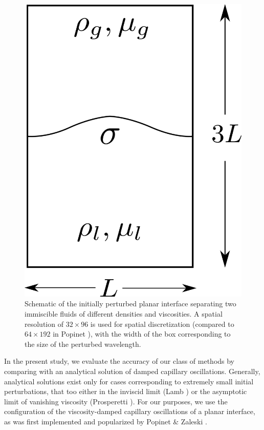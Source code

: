 \begin{figure}[h!]
    \centering
    \includegraphics[width = 1.0\textwidth]{plots/capwave/capwave_conf.png}
	\caption{Schematic of the initially perturbed planar interface separating two immiscible fluids of different densities and viscosities. A spatial resolution of $32 \times 96$ is used for spatial discretization (compared to $64 \times 192$ in Popinet \cite{popinet2009accurate}), with the width of the box corresponding to the size of the perturbed wavelength.}
    \label{capwave_conf}
\end{figure}

In the present study, we evaluate the accuracy of our class of methods by comparing with an analytical solution of damped capillary oscillations. Generally, analytical solutions exist only for cases corresponding to extremely small initial perturbations, that too either in the inviscid limit (Lamb ) or the asymptotic limit of vanishing viscosity (Prosperetti ). For our purposes, we use the configuration of the viscosity-damped capillary oscillations of a planar interface, as was first implemented and popularized by Popinet \& Zaleski \cite{popinet1999front}.  

